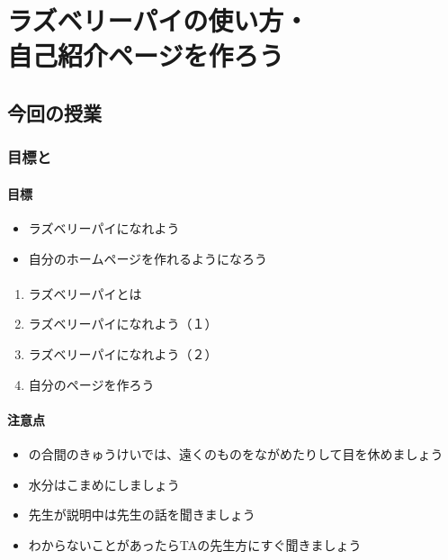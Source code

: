 \documentclass[text01.tex]{subfiles}
\begin{document}
%
% 
\chapter{ラズベリーパイの使い方・\\自己紹介ページを作ろう}

% 
% 
\section{今回の授業}

% 
% 
\subsection{目標と}

% 
% 
\subsubsection{目標}

\begin{itemize}
  \item ラズベリーパイになれよう
  \item 自分のホームページを作れるようになろう
\end{itemize}

% 
% 
\subsubsection{}

\begin{enumerate}
  \item ラズベリーパイとは
  \item ラズベリーパイになれよう（１）
  \item ラズベリーパイになれよう（２）
  \item 自分のページを作ろう
\end{enumerate}

% 
% 
\subsubsection{注意点}

\begin{itemize}
  \item {}の合間のきゅうけいでは、遠くのものをながめたりして目を休めましょう
  \item 水分はこまめにしましょう
  \item 先生が説明中は先生の話を聞きましょう
  \item わからないことがあったらTAの先生方にすぐ聞きましょう
\end{itemize}
\end{document}
